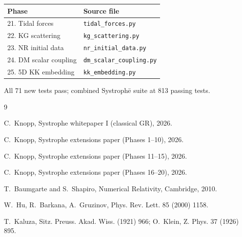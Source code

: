 \documentclass[11pt,a4paper]{article}
\begin{document}
\begin{center}
\begin{tabular}{ll}
\toprule
Phase & Source file \\
\midrule
21. Tidal forces & \texttt{tidal\_forces.py} \\
22. KG scattering & \texttt{kg\_scattering.py} \\
23. NR initial data & \texttt{nr\_initial\_data.py} \\
24. DM scalar coupling & \texttt{dm\_scalar\_coupling.py} \\
25. 5D KK embedding & \texttt{kk\_embedding.py} \\
\bottomrule
\end{tabular}
\end{center}

All 71 new tests pass; combined Systroph\=e suite at 813 passing tests.


\begin{thebibliography}{9}

C.~Knopp, Systrophe whitepaper I (classical GR), 2026.

C.~Knopp, Systrophe extensions paper (Phases 1--10), 2026.

C.~Knopp, Systrophe extensions paper (Phases 11--15), 2026.

C.~Knopp, Systrophe extensions paper (Phases 16--20), 2026.

T.~Baumgarte and S.~Shapiro, Numerical Relativity, Cambridge, 2010.

W.~Hu, R.~Barkana, A.~Gruzinov, Phys. Rev. Lett. 85 (2000) 1158.

T.~Kaluza, Sitz. Preuss. Akad. Wiss. (1921) 966; O.~Klein, Z. Phys.
37 (1926) 895.

\end{thebibliography}
\end{document}
